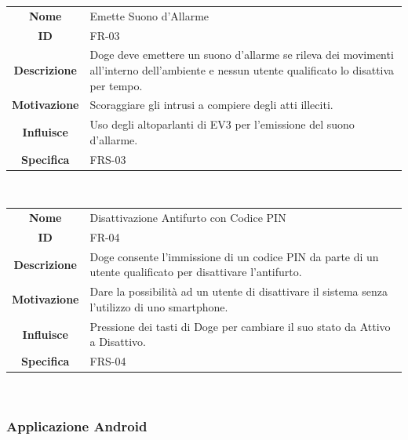 \documentclass{article}
\begin{document}
    \begin{adjustbox}{center}
    \begin{tabular}{|c|p{10cm}|}
    \hline
    \textbf{Nome} & Emette Suono d'Allarme \\
    \textbf{ID} & FR-03 \\
    \textbf{Descrizione} & Doge deve emettere un suono d'allarme se rileva dei movimenti all'interno dell'ambiente e nessun utente qualificato lo disattiva per tempo. \\
    \textbf{Motivazione} & Scoraggiare gli intrusi a compiere degli atti illeciti. \\
    \textbf{Influisce} & Uso degli altoparlanti di EV3 per l'emissione del suono d'allarme. \\
    \textbf{Specifica} & FRS-03 \\
    \hline
    \end{tabular}
    \end{adjustbox}
    
    ~
    
    \begin{adjustbox}{center}
    \begin{tabular}{|c|p{10cm}|}
    \hline
    \textbf{Nome} & Disattivazione Antifurto con Codice PIN \\
    \textbf{ID} & FR-04 \\
    \textbf{Descrizione} & Doge consente l'immissione di un codice PIN da parte di un utente qualificato per disattivare l'antifurto. \\
    \textbf{Motivazione} & Dare la possibilità ad un utente di disattivare il sistema senza l'utilizzo di uno smartphone. \\
    \textbf{Influisce} & Pressione dei tasti di Doge per cambiare il suo stato da Attivo a Disattivo. \\
    \textbf{Specifica} & FRS-04 \\
    \hline
    \end{tabular}
    \end{adjustbox}
    
    ~
    
    \subsubsection{Applicazione Android}
    
\end{document}
